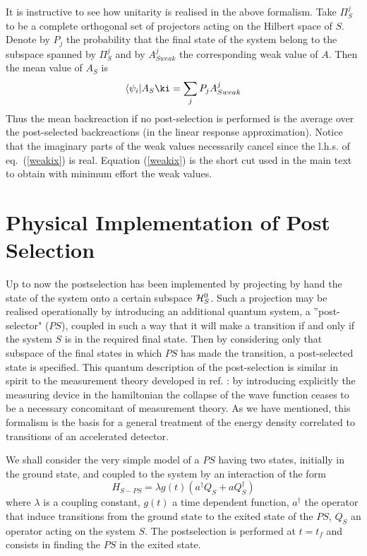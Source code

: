 \documentclass[12pt,oneside]{report}
\def\bra#1{\langle #1|}
\def\la{\lambda}
\newcommand{\bi}{\mbox{$ \bra{\psi_i} $}}
\begin{document}
It is instructive to see how unitarity is realised in the above formalism.
Take
 $\Pi^j_S$ 
to be  a 
complete orthogonal set of projectors acting on the
Hilbert space of $S$. Denote by $P_j$ the probability that
the final state of the system belong to the subspace spanned by $\Pi^j_S$ and
by $A_{S weak}^j$ the corresponding weak value of $A$. Then the mean value of
$A_S$ is  \begin{equation} \bi A_S \ki =
\sum_j P_j A_{S weak}^j  \label{weakix} 
\end{equation} 
Thus the mean
backreaction if no post-selection is performed is the average over the
post-selected backreactions (in the linear response approximation). 
Notice that the imaginary parts of the weak
values necessarily cancel since the l.h.s. of eq.~(\ref{weakix}) is
real. Equation (\ref{weakix}) is the short cut used in the main text to
obtain with minimum effort the weak values.

\section{Physical Implementation of Post Selection}
Up to now the postselection has been implemented by projecting
by
hand
the state of
the system onto a certain subspace ${\cal H}^{0}_S$.
Such a projection may be
realised operationally by introducing
an additional
quantum
system, a ''post-selector" ($PS$),
coupled in such a way
 that it will make a transition if and only if the system $S$
is in the required final state. Then by considering
only that subspace of the
final states in which $PS$ has made the
transition, a post-selected state is specified. This
quantum description of the
post-selection
is similar in spirit to the measurement theory developed in ref.
\cite{Vonn}: by introducing explicitly the measuring device in the
hamiltonian the collapse of the wave function ceases to be a necessary
concomitant of measurement theory. As we have mentioned, this formalism is
the basis for a general treatment of the energy density correlated to
transitions of an accelerated detector.

We shall consider the very simple model of a $PS$ having two states,
initially in the ground state, and coupled to the system by an interaction
of the form \begin{equation}
H_{S-PS} = \la g(t) ( a^\dagger Q_S + a Q_S^\dagger)
\label{weakx}
\end{equation}
where $\la$ is a
coupling constant, $g(t)$ a time dependent function, $a^\dagger$  the operator
that induce transitions from the ground state to the exited state of the
$PS$, $Q_S$ an operator acting on the system $S$. The
postselection is performed at $t=t_f$ and consists in finding the $PS$ in the
exited state.
\end{document}
